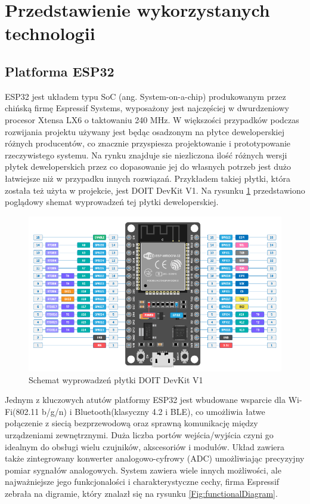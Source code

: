 \documentclass[12pt,twoside]{article}
\begin{document}
\section{Przedstawienie wykorzystanych technologii}
\subsection{Platforma ESP32}
ESP32 jest układem typu SoC (ang. System-on-a-chip) produkowanym przez chińską firmę Espressif Systems,
wyposażony jest najczęściej w dwurdzeniowy procesor Xtensa LX6 o taktowaniu 240 MHz\cite{esp32Datasheet}. W większości przypadków podczas rozwijania projektu używany jest będąc osadzonym na płytce deweloperskiej różnych producentów, co znacznie przyspiesza projektowanie i prototypowanie rzeczywistego systemu. Na rynku znajduje sie niezliczona ilość różnych wersji płytek deweloperskich przez co dopasowanie
jej do własnych potrzeb jest dużo łatwiejsze niż w przypadku innych rozwiązań. Przykładem takiej płytki, która została też użyta w projekcie, jest DOIT DevKit V1\cite{doitDevKitV1}. Na rysunku \ref*{Fig:devkitScheme} przedstawiono poglądowy shemat wyprowadzeń tej płytki deweloperskiej.

\begin{figure}[ht]
   \centering
   \includegraphics[width=13cm]{images/doit_devkit_v1.png}
   \caption{Schemat wyprowadzeń płytki DOIT DevKit V1 \cite{doitDevKitV1}}
   \label{Fig:devkitScheme}
\end{figure}

Jednym z kluczowych atutów platformy ESP32 jest wbudowane wsparcie dla Wi-Fi(802.11 b/g/n) i Bluetooth(klasyczny 4.2 i BLE), co umożliwia łatwe połączenie z siecią bezprzewodową oraz sprawną komunikację między urządzeniami zewnętrznymi.
Duża licz\-ba portów wejścia/wyjścia czyni go idealnym do obsługi wielu czujników, akscesoriów i modułów. Układ zawiera także zintegrowany konwerter analogowo-cyfrowy (ADC) umożliwiając precyzyjny pomiar sygnałów analogowych. System zawiera wiele innych możliwości, ale najważniejsze jego funkcjonalości i charakterystyczne cechy, firma Espressif zebrała na digramie,  który znalazł się na rysunku \ref*{Fig:functionalDiagram}.
\end{document}
